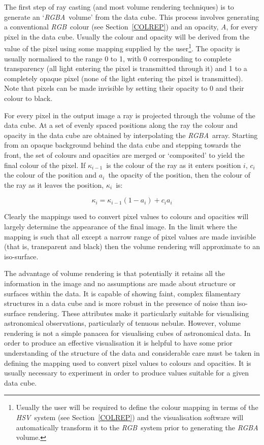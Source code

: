 The first step of ray casting (and most volume rendering techniques)
is to generate an `{\it RGBA}\, volume' from the data cube. This
process involves generating a conventional {\it RGB}\, colour (see
Section~\ref{COLREP}) and an opacity, {\it A}, for every pixel in the
data cube. Usually the colour and opacity will be derived from the
value of the pixel using some mapping supplied by the 
user\footnote{Usually the user will be required to define the colour
mapping in terms of the {\it HSV}\, system (see Section~\ref{COLREP})
and the visualisation software will automatically transform it to the
{\it RGB}\, system prior to generating the {\it RGBA}\, volume.}. The
opacity is usually normalised to the range 0 to 1, with 0 corresponding
to complete transparency (all light entering the pixel is transmitted
through it) and 1 to a completely opaque pixel (none of the light 
entering the pixel is transmitted). Note that pixels can be made invisible
by setting their opacity to 0 and their colour to black.

For every pixel in the output image a ray is projected through the 
volume of the data cube. At a set of evenly spaced positions along the
ray the colour and opacity in the data cube are obtained by
interpolating the {\it RGBA}\, array. Starting from an opaque background
behind the data cube and stepping towards the front, the set of colours
and opacities are merged or `composited' to yield the final colour of
the pixel. If $\kappa_{i-1}$\, is the colour of the ray as it enters position
$i$, $c_{i}$ the colour of the position and $a_{i}$\, the opacity
of the position, then the colour of the ray as it leaves the position,
$\kappa_{i}$\, is:

\begin{equation}
\kappa_{i} = \kappa_{i-1} ( 1 - a_{i} ) + c_{i} a_{i}
\end{equation}

Clearly the mappings used to convert pixel values to colours and
opacities will largely determine the appearance of the final image.
In the limit where the mapping is such that all except a narrow range of
pixel values are made invisible (that is, transparent and black) then
the volume rendering will approximate to an iso-surface.

The advantage of volume rendering is that potentially it retains all the
information in the image and no assumptions are made about structure or
surfaces within the data. It is capable of showing faint, complex
filamentary structures in a data cube and is more robust in the presence
of noise than iso-surface rendering. These attributes make it particularly
suitable for visualising astronomical observations, particularly of
tenuous nebul\ae. However, volume rendering is not a simple panacea for
visualising cubes of astronomical data. In order to produce an effective
visualisation it is helpful to have some prior understanding of the
structure of the data and considerable care must be taken in defining
the mapping used to convert pixel values to colours and opacities.
It is usually necessary to experiment in order to produce values suitable
for a given data cube.

